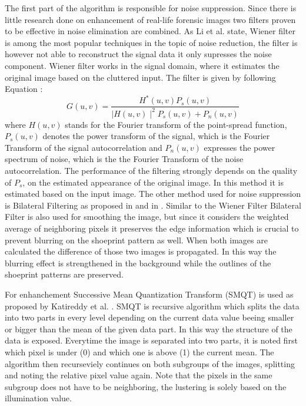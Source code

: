 \documentclass[draft,final]{vutinfth} %
\begin{document}
\par
The first part of the algorithm is responsible for noise suppression.
Since there is little research done on enhancement of real-life forensic images two filters proven to be effective in noise elimination are combined.
As Li et al. \cite{li2014rapid} state, Wiener filter is among the most popular techniques in the topic of noise reduction, the filter is however not able to reconstruct the signal data it only supresses the noise component.
Wiener filter works in the signal domain, where it estimates the original image based on the cluttered input. 
The filter is given by following Equation \cite{Win}:
\[ G(u, v) = \frac{H^*(u,v) P_s(u, v)}{\mid H(u,v)\mid ^2 P_s (u, v) + P_n (u, v)}  \]
where $H(u,v)$ stands for the Fourier transform of the point-spread function, $P_s (u,v)$ denotes the power transform of the signal, which is the Fourier Transform of the signal autocorrelation and $P_n(u,v)$ expresses the power spectrum of noise, which is the the Fourier Transform of the noise autocorrelation.
The performance of the filtering strongly depends on the quality of $P_s$, on the estimated appearance of the original image.
In this method it is estimated based on the input image.
The other method used for noise suppression is Bilateral Filtering as proposed in \cite{huang2013self} and in \cite{zhang2016simultaneous}.
Similar to the Wiener Filter Bilateral Filter is also used for smoothing the image, but since it considers the weighted average of neighboring pixels it preserves the edge information which is crucial to prevent blurring on the shoeprint pattern as well. 
When both images are calculated the difference of those two images is propagated.
In this way the blurring effect is strengthened in the background while the outlines of the shoeprint patterns are preserved.
\par
For enhanchement Successive Mean Quantization Transform (SMQT) \cite{nilsson2013smqt} is used as proposed by Katireddy et al. \cite{katireddy2017novel}.
SMQT is recursive algorithm which splits the data into two parts in every level depending on the current data value beeing smaller or bigger than the mean of the given data part.
In this way the structure of the data is exposed.
Everytime the image is separated into two parts, it is noted first which pixel is under (0) and which one is above (1) the current mean.
The algorithm then recurseviely continues on both subgroups of the images, splitting and noting the relative pixel value again.
Note that the pixels in the same subgroup does not have to be neighboring, the lustering is solely based on the illumination value.
\end{document}
